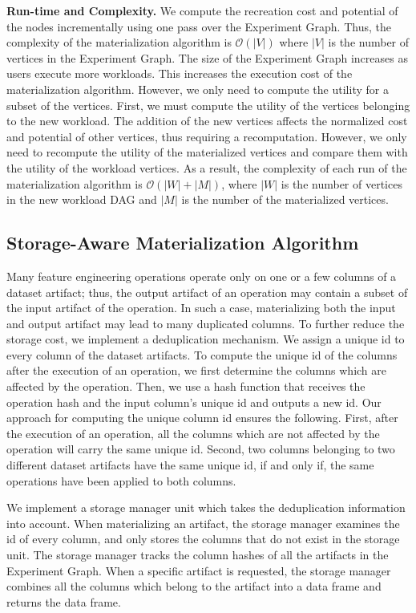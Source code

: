\textbf{Run-time and Complexity.}
We compute the recreation cost and potential of the nodes incrementally using one pass over the Experiment Graph.
Thus, the complexity of the materialization algorithm is $\mathcal{O}(|V|)$ where $|V|$ is the number of vertices in the Experiment Graph.
The size of the Experiment Graph increases as users execute more workloads.
This increases the execution cost of the materialization algorithm.
However, we only need to compute the utility for a subset of the vertices. 
First, we must compute the utility of the vertices belonging to the new workload.
The addition of the new vertices affects the normalized cost and potential of other vertices, thus requiring a recomputation.
However, we only need to recompute the utility of the materialized vertices and compare them with the utility of the workload vertices.
As a result, the complexity of each run of the materialization algorithm is $\mathcal{O}(|W| + |M|)$, where $|W|$ is the number of vertices in the new workload DAG and $|M|$ is the number of the materialized vertices.
\subsection{Storage-Aware Materialization Algorithm}\label{subsec-storage-aware}
Many feature engineering operations operate only on one or a few columns of a dataset artifact; thus, the output artifact of an operation may contain a subset of the input artifact of the operation.
In such a case, materializing both the input and output artifact may lead to many duplicated columns.
To further reduce the storage cost, we implement a deduplication mechanism.
We assign a unique id to every column of the dataset artifacts.
To compute the unique id of the columns after the execution of an operation, we first determine the columns which are affected by the operation.
Then, we use a hash function that receives the operation hash and the input column's unique id and outputs a new id.
Our approach for computing the unique column id ensures the following.
First, after the execution of an operation, all the columns which are not affected by the operation will carry the same unique id.
Second, two columns belonging to two different dataset artifacts have the same unique id, if and only if, the same operations have been applied to both columns.

We implement a storage manager unit which takes the deduplication information into account.
When materializing an artifact, the storage manager examines the id of every column, and only stores the columns that do not exist in the storage unit.
The storage manager tracks the column hashes of all the artifacts in the Experiment Graph.
When a specific artifact is requested, the storage manager combines all the columns which belong to the artifact into a data frame and returns the data frame.

